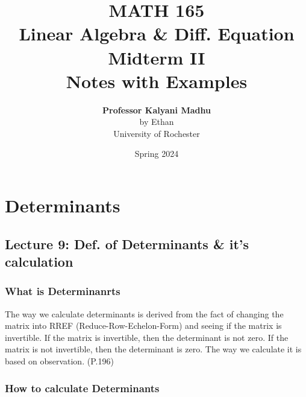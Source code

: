 \documentclass[oneside]{book}
\def\notetitle{MATH 165\\Linear Algebra \& Diff. Equation\\Midterm II \\Notes with Examples}
\def\noteauthor{
    \textbf{Professor Kalyani Madhu} \\ 
    by Ethan\\
    University of Rochester}
\def\notedate{Spring 2024}
\begin{document}
\title{\textbf{
    \LARGE{\notetitle} \vspace*{10\baselineskip}}
    }
\author{\noteauthor}
\date{\notedate}

\maketitle
\newpage

\tableofcontents
\newpage

\chapter{Determinants}
\section{Lecture 9: Def. of Determinants \& it's calculation}


\subsection{What is Determinanrts}

The way we calculate determinants is derived from the fact of changing the matrix into RREF (Reduce-Row-Echelon-Form) and seeing if the matrix is invertible. If the matrix is invertible, then the determinant is not zero. If the matrix is not invertible, then the determinant is zero. The way we calculate it is based on observation. (P.196)

\subsection{How to calculate Determinants}
\end{document}
